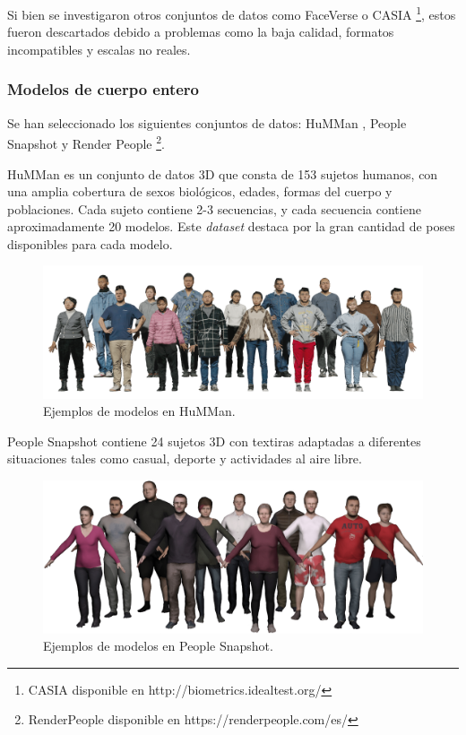 Si bien se investigaron otros conjuntos de datos como FaceVerse \cite{64} o CASIA \footnote{CASIA disponible en http://biometrics.idealtest.org/}, estos fueron descartados debido a problemas como la baja calidad, formatos incompatibles y escalas no reales.

\subsubsection{Modelos de cuerpo entero}
Se han seleccionado los siguientes conjuntos de datos: HuMMan \cite{62}, People Snapshot \cite{63} y Render People \footnote{RenderPeople disponible en https://renderpeople.com/es/}.

HuMMan \cite{62} es un conjunto de datos 3D que consta de 153 sujetos humanos, con una amplia cobertura de sexos biológicos, edades, formas del cuerpo y poblaciones. Cada sujeto contiene 2-3 secuencias, y cada secuencia contiene aproximadamente 20 modelos. Este \textit{dataset} destaca por la gran cantidad de poses disponibles para cada modelo.

\begin{figure}[h]
	\centering
	\includegraphics[scale=0.4]{imagenes/cap4/humman.png}
	\caption[Ejemplos HuMMan.]{Ejemplos de modelos en HuMMan.}
	\label{fig19}
\end{figure}

People Snapshot \cite{63} contiene 24 sujetos 3D con textiras adaptadas a diferentes situaciones tales como casual, deporte y actividades al aire libre.

\begin{figure}[h]
	\centering
	\includegraphics[scale=0.5]{imagenes/cap4/snapshot.png}
	\caption[Ejemplos People Snapshot]{Ejemplos de modelos en People Snapshot.}
	\label{fig20}
\end{figure}


